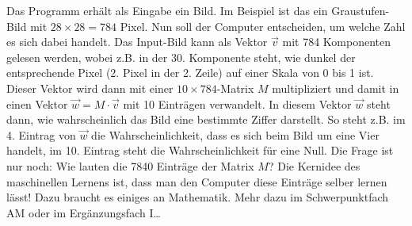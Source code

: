 Das Programm erhält als Eingabe ein Bild. Im Beispiel ist das ein Graustufen-Bild mit $28\times28 =784$ Pixel. Nun soll der Computer entscheiden, um welche Zahl es sich dabei handelt.
Das Input-Bild kann als Vektor $\vec{v}$ mit 784 Komponenten gelesen werden, wobei z.B. in der 30. Komponente steht, wie dunkel der entsprechende Pixel (2. Pixel in der 2. Zeile) auf einer Skala von 0 bis 1 ist. Dieser Vektor wird dann mit einer $10\times784$-Matrix $M$ multipliziert und damit in einen Vektor $\vec{w} = M \cdot \vec{v}$ mit 10 Einträgen verwandelt. In diesem Vektor $\vec{w}$ steht dann, wie wahrscheinlich das Bild eine bestimmte Ziffer darstellt. So steht z.B. im 4. Eintrag von $\vec{w}$  die Wahrscheinlichkeit, dass es sich beim Bild um eine Vier handelt, im 10. Eintrag steht die Wahrscheinlichkeit für eine Null.
Die Frage ist nur noch: Wie lauten die 7840 Einträge der Matrix $M$? Die Kernidee des maschinellen Lernens ist, dass man den Computer diese Einträge selber lernen lässt! Dazu braucht es einiges an Mathematik. Mehr dazu im Schwerpunktfach AM oder im Ergänzungsfach I\dots

